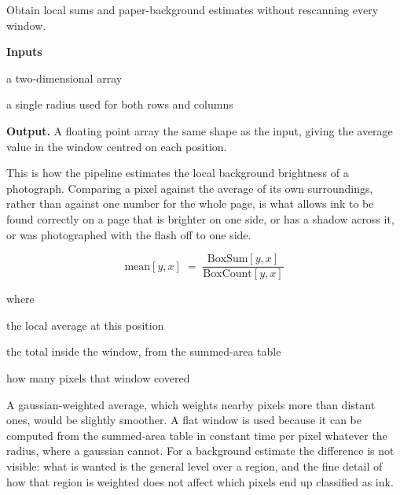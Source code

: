Obtain local sums and paper-background estimates without rescanning every window.




\noindent\textbf{Inputs}
\begin{description}[leftmargin=2.2em,style=nextline,font=\normalfont\ttfamily]\setlength\itemsep{1pt}
  \item[{img}] \normalfont a two-dimensional array
  \item[{r}] \normalfont a single radius used for both rows and columns
\end{description}

\noindent\textbf{Output.} A floating point array the same shape as the input, giving the average value in the window centred on each position.


This is how the pipeline estimates the local background brightness of a photograph. Comparing a pixel against the average of its own surroundings, rather than against one number for the whole page, is what allows ink to be found correctly on a page that is brighter on one side, or has a shadow across it, or was photographed with the flash off to one side.



\begin{equation}
\mathrm{mean}[y,x] \;=\; \frac{\mathrm{BoxSum}[y,x]}{\mathrm{BoxCount}[y,x]}
\end{equation}

\noindent where
\begin{description}[leftmargin=2.4em,style=nextline,font=\normalfont\ttfamily]\setlength\itemsep{1pt}
  \item[{$\mathrm{mean}[y,x]$}] \normalfont the local average at this position
  \item[{$\mathrm{BoxSum}[y,x]$}] \normalfont the total inside the window, from the summed-area table
  \item[{$\mathrm{BoxCount}[y,x]$}] \normalfont how many pixels that window covered
\end{description}

A gaussian-weighted average, which weights nearby pixels more than distant ones, would be slightly smoother. A flat window is used because it can be computed from the summed-area table in constant time per pixel whatever the radius, where a gaussian cannot. For a background estimate the difference is not visible: what is wanted is the general level over a region, and the fine detail of how that region is weighted does not affect which pixels end up classified as ink.



